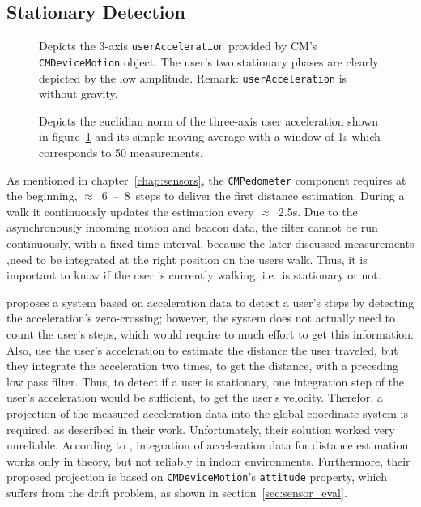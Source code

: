 \subsection{Stationary Detection}\label{sec:algo_stationary}

\begin{figure}
	
	\caption{Depicts the 3-axis \texttt{userAcceleration} provided by \acs{CM}'s \texttt{CMDeviceMotion} object. The user's two stationary phases are clearly depicted by the low amplitude. Remark: \texttt{userAcceleration} is without gravity.}
	\label{fig:mm_stationary_1}
\end{figure}

\begin{figure}
	
	\caption{Depicts the euclidian norm of the three-axis user acceleration shown in figure~\ref{fig:mm_stationary_1} and its simple moving average with a window of 1s which corresponds to 50 measurements.}
	\label{fig:mm_stationary_2}
\end{figure}

As mentioned in chapter~\ref{chap:sensors}, the \texttt{CMPedometer} component requires at the beginning, $\approx$~6~--~8~steps to deliver the first distance estimation. During a walk it continuously updates the estimation every $\approx$~2.5s. Due to the asynchronously incoming motion and beacon data, the filter cannot be run continuously, with a fixed time interval, because the later discussed measurements ,need to be integrated at the right position on the users walk. Thus, it is important to know if the user is currently walking, i.e.\ is stationary or not.

\citet{wang:wlan} proposes a system based on acceleration data to detect a user's steps by detecting the acceleration's zero-crossing; however, the system does not actually need to count the user's steps, which would require to much effort to get this information. Also,\citet{shanklin:embedded_sensors} use the user's acceleration to estimate the distance the user traveled, but they integrate the acceleration two times, to get the distance, with a preceding low pass filter. Thus, to detect if a user is stationary, one integration step of the user's acceleration would be sufficient, to get the user's velocity. Therefor, a projection of the measured acceleration data into the global coordinate system is required, as described in their work. Unfortunately, their solution worked very unreliable. According to \citet{wang:wlan}, integration of acceleration data for distance estimation works only in theory, but not reliably in indoor environments. Furthermore, their proposed projection is based on \texttt{CMDeviceMotion}'s \texttt{attitude} property, which suffers from the drift problem, as shown in section~\ref{sec:sensor_eval}.


